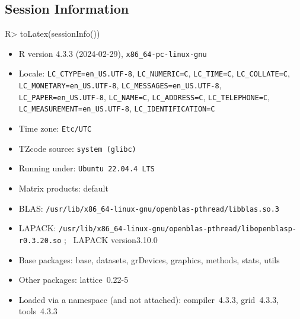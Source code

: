 \documentclass{article}
\begin{document}
\subsection*{Session Information}

\begin{Schunk}
\begin{Sinput}
R> toLatex(sessionInfo())
\end{Sinput}
\begin{itemize}\raggedright
  \item R version 4.3.3 (2024-02-29), \verb|x86_64-pc-linux-gnu|
  \item Locale: \verb|LC_CTYPE=en_US.UTF-8|, \verb|LC_NUMERIC=C|, \verb|LC_TIME=C|, \verb|LC_COLLATE=C|, \verb|LC_MONETARY=en_US.UTF-8|, \verb|LC_MESSAGES=en_US.UTF-8|, \verb|LC_PAPER=en_US.UTF-8|, \verb|LC_NAME=C|, \verb|LC_ADDRESS=C|, \verb|LC_TELEPHONE=C|, \verb|LC_MEASUREMENT=en_US.UTF-8|, \verb|LC_IDENTIFICATION=C|
  \item Time zone: \verb|Etc/UTC|
  \item TZcode source: \verb|system (glibc)|
  \item Running under: \verb|Ubuntu 22.04.4 LTS|
  \item Matrix products: default
  \item BLAS:   \verb|/usr/lib/x86_64-linux-gnu/openblas-pthread/libblas.so.3|
  \item LAPACK: \verb|/usr/lib/x86_64-linux-gnu/openblas-pthread/libopenblasp-r0.3.20.so|
; \quad\ LAPACK version3.10.0
  \item Base packages: base, datasets, grDevices, graphics,
    methods, stats, utils
  \item Other packages: lattice~0.22-5
  \item Loaded via a namespace (and not attached):
    compiler~4.3.3, grid~4.3.3, tools~4.3.3
\end{itemize}\end{Schunk}
\end{document}
